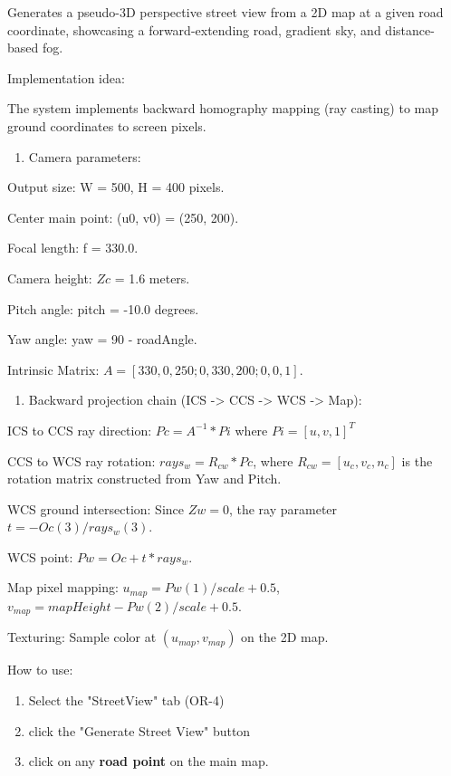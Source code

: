 \documentclass[12pt,a4paper]{ctexart}
\begin{document}
Generates a pseudo-3D perspective street view from a 2D map at a given road coordinate, showcasing a forward-extending road, gradient sky, and distance-based fog.

Implementation idea:

The system implements backward homography mapping (ray casting) to map ground coordinates to screen pixels.

\begin{enumerate}
  \item Camera parameters:
\end{enumerate}

Output size: W = 500, H = 400 pixels.

Center main point: (u0, v0) = (250, 200).

Focal length: f = 330.0.

Camera height: $Zc$ = 1.6 meters.

Pitch angle: pitch = -10.0 degrees.

Yaw angle: yaw = 90 - roadAngle.

Intrinsic Matrix: $A = [330, 0, 250; 0, 330, 200; 0, 0, 1]$.

\begin{enumerate}
  \item Backward projection chain (ICS -> CCS -> WCS -> Map):
\end{enumerate}

ICS to CCS ray direction: $Pc = A^{-1} * Pi$ where $Pi = [u, v, 1]^T$

CCS to WCS ray rotation: $rays_w = R_{cw} * Pc$, where $R_{cw} = [u_c, v_c, n_c]$ is the rotation matrix constructed from Yaw and Pitch.

WCS ground intersection: Since $Zw = 0$, the ray parameter $t = -Oc(3) / rays_w(3)$.

WCS point: $Pw = Oc + t * rays_w$.

Map pixel mapping: $u_{map} = Pw(1)/scale + 0.5$, $v_{map} = mapHeight - Pw(2)/scale + 0.5$.

Texturing: Sample color at $(u_{map}, v_{map})$ on the 2D map.

How to use:

\begin{enumerate}
  \item Select the "StreetView" tab (OR-4)
  \item click the "Generate Street View" button
  \item click on any \textbf{road point} on the main map.
\end{enumerate}
\end{document}
